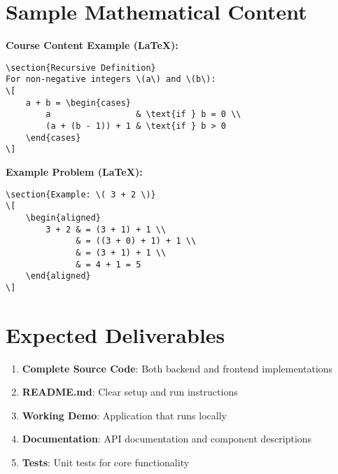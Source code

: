 \documentclass[11pt,a4paper]{article}
\begin{document}
\section{Sample Mathematical Content}

\begin{codebox}
\textbf{Course Content Example (LaTeX):}
\begin{verbatim}
\section{Recursive Definition}
For non-negative integers \(a\) and \(b\):
\[
    a + b = \begin{cases}
        a                 & \text{if } b = 0 \\
        (a + (b - 1)) + 1 & \text{if } b > 0
    \end{cases}
\]
\end{verbatim}
\end{codebox}

\begin{codebox}
\textbf{Example Problem (LaTeX):}
\begin{verbatim}
\section{Example: \( 3 + 2 \)}
\[
    \begin{aligned}
        3 + 2 & = (3 + 1) + 1 \\
              & = ((3 + 0) + 1) + 1 \\
              & = (3 + 1) + 1 \\
              & = 4 + 1 = 5
    \end{aligned}
\]
\end{verbatim}
\end{codebox}

\section{Expected Deliverables}

\begin{enumerate}
    \item \textbf{Complete Source Code}: Both backend and frontend implementations
    \item \textbf{README.md}: Clear setup and run instructions
    \item \textbf{Working Demo}: Application that runs locally
    \item \textbf{Documentation}: API documentation and component descriptions
    \item \textbf{Tests}: Unit tests for core functionality
\end{enumerate}
\end{document}
